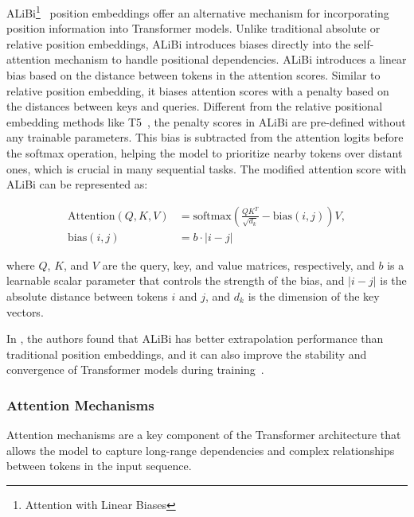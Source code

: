 ALiBi\footnote{Attention with Linear Biases}~\cite{press2022train} position embeddings offer an alternative mechanism for incorporating position information into Transformer models.
Unlike traditional absolute or relative position embeddings, ALiBi introduces biases directly into the self-attention mechanism to handle positional dependencies.
ALiBi introduces a linear bias based on the distance between tokens in the attention scores.
Similar to relative position embedding, it biases attention scores with a penalty based on the distances between keys and queries.
Different from the relative positional embedding methods like T5~\cite{zeng2021pangu}, the penalty scores in ALiBi are pre-defined without any trainable parameters.
This bias is subtracted from the attention logits before the softmax operation, helping the model to prioritize nearby tokens over distant ones, which is crucial in many sequential tasks.
The modified attention score with ALiBi can be represented as:

\begin{equation}
	\begin{aligned}
		\text{Attention}(Q, K, V) & = \text{softmax}\left(\frac{QK^T}{\sqrt{d_k}} - \text{bias}(i,j)\right)V, \\
		\text{bias}(i,j)          & = b \cdotp |i-j|
	\end{aligned}
	\label{eq:alibi}
\end{equation}

\noindent where \(Q\), \(K\), and \(V\) are the query, key, and value matrices, respectively, and \(b\) is a learnable scalar parameter that controls the strength of the bias, and \(|i-j|\) is the absolute distance between tokens \(i\) and \(j\), and \(d_k\) is the dimension of the key vectors.

In \textcite{press2022train}, the authors found that ALiBi has better extrapolation performance than traditional position embeddings, and it can also improve the stability and convergence of Transformer models during training~\cite{workshop2023bloom}.

\subsubsection{Attention Mechanisms}
\label{subsubsec:attention-mechanisms}

Attention mechanisms are a key component of the Transformer architecture that allows the model to capture long-range dependencies and complex relationships between tokens in the input sequence.

